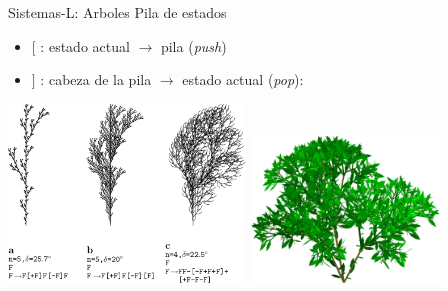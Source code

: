 \documentclass[spanish,unknownkeysallowed]{beamer}
\begin{document}
\begin{frame}{Sistemas-L: Arboles}
Pila de estados
\begin{itemize}
\item $[$ : estado actual $\rightarrow$ pila ({\em push})
\item $]$ : cabeza de la pila $\rightarrow$ estado actual ({\em pop}):
\end{itemize}

\center
\includegraphics[width=6.3cm]{../figures/sistemalcorchete}
\includegraphics[width=5cm]{../figures/3dlsystem}

\end{frame}
\end{document}
